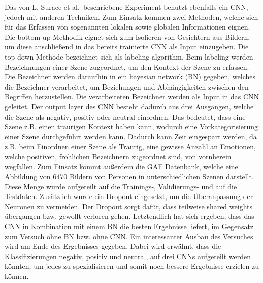 Das von L. Surace et al.~beschriebene Experiment \cite{wildemotionrec} benutzt ebenfalls ein CNN, jedoch mit anderen Techniken. Zum Einsatz kommen zwei Methoden, welche sich für das Erfassen von sogenannten lokalen sowie globalen Informationen eignen. Die bottom-up Methodik eignet sich zum Isolieren von Gesichtern aus Bildern, um diese anschließend in das bereits trainierte CNN als Input einzugeben. Die top-down Methode bezeichnet sich als labeling algorithm. Beim labeling werden Bezeichnungen einer Szene zugeordnet, um den Kontext der Szene zu erfassen. Die Bezeichner werden daraufhin in ein bayesian network (BN) \cite{wildemotionrec} gegeben, welches die Bezeichner verarbeitet, um Beziehungen und Abhängigkeiten zwischen den Begriffen herzustellen. Die verarbeiteten Bezeichner werden als Input in das CNN geleitet. Der output layer des CNN besteht dadurch aus drei Ausgängen, welche die Szene als negativ, positiv oder neutral einordnen. Das bedeutet, dass eine Szene z.B. einen traurigen Kontext haben kann, wodurch eine Vorkategorisierung einer Szene durchgeführt werden kann. Dadurch kann Zeit eingespart werden, da z.B. beim Einordnen einer Szene als Traurig, eine gewisse Anzahl an Emotionen, welche positiven, fröhlichen Bezeichnern zugeordnet sind, von vornherein wegfallen. Zum Einsatz kommt außerdem die GAF Datenbank, welche eine Abbildung von 6470 Bildern von Personen in unterschiedlichen Szenen darstellt. Diese Menge wurde aufgeteilt auf die Trainings-, Validierungs- und auf die Testdaten. Zusätzlich wurde ein Dropout eingesetzt, um die Überanpassung der Neuronen zu vermeiden. Der Dropout sorgt dafür, dass teilweise shared weights übergangen bzw. gewollt verloren gehen. Letztendlich hat sich ergeben, dass das CNN in Kombination mit einem BN die besten Ergebnisse liefert, im Gegensatz zum Versuch ohne BN bzw. ohne CNN. Ein interessanter Ausbau des Versuches wird am Ende des Ergebnisses gegeben. Dabei wird erwähnt, dass die Klassifizierungen negativ, positiv und neutral, auf drei CNNs aufgeteilt werden könnten, um jedes zu spezialisieren und somit noch bessere Ergebnisse erzielen zu können.


